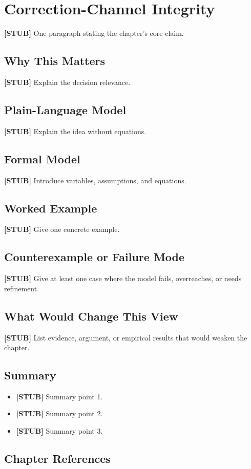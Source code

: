 \chapter{Correction-Channel Integrity}
\label{ch:correction-channel-integrity}

\begin{chapterthesis}
\textbf{[STUB]} One paragraph stating the chapter's core claim.
\end{chapterthesis}

\section{Why This Matters}

\textbf{[STUB]} Explain the decision relevance.

\section{Plain-Language Model}

\textbf{[STUB]} Explain the idea without equations.

\section{Formal Model}

\textbf{[STUB]} Introduce variables, assumptions, and equations.

\section{Worked Example}

\textbf{[STUB]} Give one concrete example.

\section{Counterexample or Failure Mode}

\textbf{[STUB]} Give at least one case where the model fails, overreaches, or needs refinement.

\section{What Would Change This View}

\textbf{[STUB]} List evidence, argument, or empirical results that would weaken the chapter.

\section{Summary}

\begin{itemize}
  \item \textbf{[STUB]} Summary point 1.
  \item \textbf{[STUB]} Summary point 2.
  \item \textbf{[STUB]} Summary point 3.
\end{itemize}

\section*{Chapter References}

